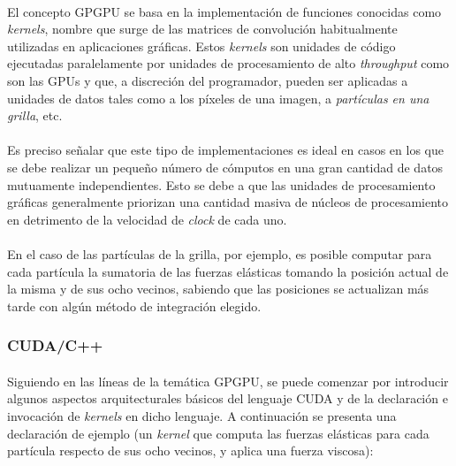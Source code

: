\documentclass[12pt, twocolumn]{article}
\begin{document}
	\paragraph{} El concepto GPGPU se basa en la implementación de funciones conocidas como \textit{kernels}, nombre que surge de las matrices de convolución habitualmente utilizadas en aplicaciones gráficas. Estos \textit{kernels} son unidades de código ejecutadas paralelamente por unidades de procesamiento de alto \textit{throughput} como son las GPUs y que, a discreción del programador, pueden ser aplicadas a unidades de datos tales como a los píxeles de una imagen, a \textit{partículas en una grilla}, etc.
	
	\paragraph{} Es preciso señalar que este tipo de implementaciones es ideal en casos en los que se debe realizar un pequeño número de cómputos en una gran cantidad de datos mutuamente independientes. Esto se debe a que las unidades de procesamiento gráficas generalmente priorizan una cantidad masiva de núcleos de procesamiento en detrimento de la velocidad de \textit{clock} de cada uno.
	
	\paragraph{} En el caso de las partículas de la grilla, por ejemplo, es posible computar para cada partícula la sumatoria de las fuerzas elásticas tomando la posición actual de la misma y de sus ocho vecinos, sabiendo que las posiciones se actualizan más tarde con algún método de integración elegido. 
	
	\subsubsection{\textbf{CUDA/C++}}
	
	\paragraph{} Siguiendo en las líneas de la temática GPGPU, se puede comenzar por introducir algunos aspectos arquitecturales básicos del lenguaje CUDA y de la declaración e invocación de \textit{kernels} en dicho lenguaje. A continuación se presenta una declaración de ejemplo (un \textit{kernel} que computa las fuerzas elásticas para cada partícula respecto de sus ocho vecinos, y aplica una fuerza viscosa):
	
\end{document}
